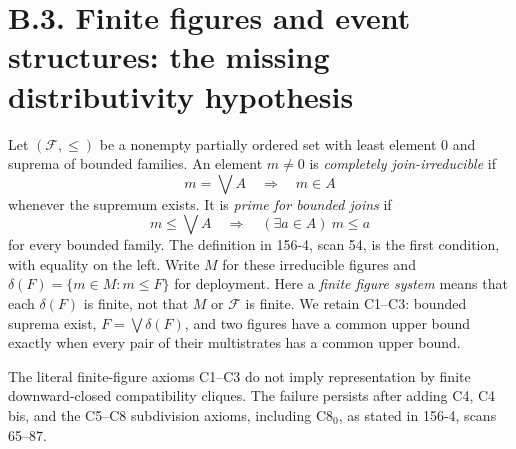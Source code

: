 
\section{B.3. Finite figures and event structures: the missing distributivity hypothesis}

\begin{definition}\label{SA21-BM-def-prime}
Let \((\mathcal F,\leq)\) be a nonempty partially ordered set with least
element \(0\) and suprema of bounded families. An element \(m\ne0\) is
\emph{completely join-irreducible} if
\[
 m=\bigvee A\quad\Longrightarrow\quad m\in A
\]
whenever the supremum exists. It is \emph{prime for bounded joins} if
\[
 m\leq\bigvee A\quad\Longrightarrow\quad
 (\exists a\in A)\ m\leq a
\]
for every bounded family. The definition in 156-4, scan 54, is the
first condition, with equality on the left. Write \(M\) for these
irreducible figures and \(\delta(F)=\{m\in M:m\leq F\}\) for deployment.
Here a \emph{finite figure system} means that each \(\delta(F)\) is
finite, not that \(M\) or \(\mathcal F\) is finite. We retain C1--C3:
bounded suprema exist, \(F=\bigvee\delta(F)\), and two figures have
a common upper bound exactly when every pair of their multistrates
has a common upper bound.
\end{definition}

\begin{counterexample}\label{SA21-BM-r12}
The literal finite-figure axioms C1--C3 do not imply representation
by finite downward-closed compatibility cliques. The failure persists
after adding C4, C4 bis, and the C5--C8 subdivision axioms, including
C8\(_0\), as stated in 156-4, scans 65--87.
\end{counterexample}

